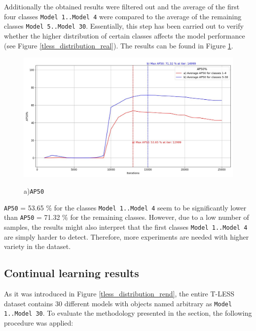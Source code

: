 Additionally the obtained results were filtered out and the average of the first four classes \texttt{Model 1..Model 4} were compared to the average of the remaining classes \texttt{Model 5..Model 30}. Essentially, this step has been carried out to verify whether the higher distribution of certain classes affects the model performance (see Figure \ref{tless_distribution_real}). The results can be found in Figure \ref{myModel_withOrigSched_grouped}.     
\begin{figure}[htb]
	\begin{center}
	\includegraphics[width=14cm]{./AP50_per_class_group.jpg}
	\end{center}
	\caption{a)\texttt{AP50}}
	\begin{center}
	\label{myModel_withOrigSched_grouped}
	\end{center}
\end{figure}
\FloatBarrier 

\texttt{AP50} = 53.65 \% for the classes \texttt{Model 1..Model 4} seem to be significantly lower than \texttt{AP50} = 71.32 \% for the remaining classes. However, due to a low number of samples, the results might also interpret that the first classes \texttt{Model 1..Model 4} are simply harder to detect. Therefore, more experiments are needed with higher variety in the dataset.  


\subsection{Continual learning results}
\label{cont_learning_results} 
As it was introduced in Figure \ref{tless_distribution_rend}, the entire T-LESS dataset contains 30 different models with objects named arbitrary as \texttt{Model 1..Model 30}. To evaluate the methodology presented in the  section, the following procedure was applied:
 
